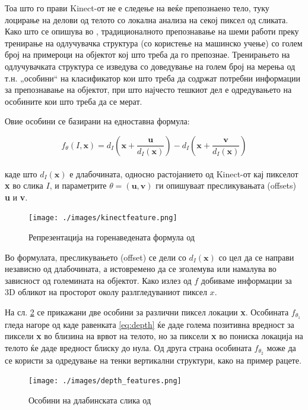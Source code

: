 \documentclass[11pt]{article}
\begin{document}
	Тоа што го прави Kinect-от не е следење на веќе препознаено тело, туку лоцирање на делови од телото со локална анализа на секој пиксел од сликата. Како што се опишува во \cite{machinelearning}, традиционалното препознавање на шеми работи преку тренирање на одлучувачка структура (со користење на машинско учење) со голем број на примероци на објектот кој што треба да го препознае. Тренирањето на одлучувачката структура се изведува со доведување на голем број на мерења од т.н. „особини“ на класификатор кои што треба да содржат потребни информации за препознавање на објектот, при што најчесто тешкиот дел е одредувањето на особините кои што треба да се мерат.\bigbreak

	Овие особини се базирани на едноставна формула:

  \begin{equation} \label{eq:depth}
	  f_\theta(I,\textbf{x}) = d_I(\textbf{x}+\frac{\textbf{u}}{d_I(\textbf{x})}) - d_I(\textbf{x}+\frac{\textbf{v}}{d_I(\textbf{x})})
    \end{equation}
  \\
  каде што $d_I(\textbf{x})$ е длабочината, односно растојанието од Kinect-от кај пикселот \textbf{x} во слика $I$, и параметрите $\theta = (\textbf{u},\textbf{v})$ ги опишуваат пресликувањата (offsets) \textbf{u} и \textbf{v}.

  \begin{figure}[H]
	  \texttt{[image: ./images/kinectfeature.png]}
		\centering
		\caption{Репрезентација на горенаведената формула од \cite{machinelearning}}
		\label{fig:kinectfeature.png}
	  \end{figure}

	Во формулата, пресликувањето (offset) се дели со $d_I(\textbf{x})$ со цел да се направи независно од длабочината, а истовремено да се зголемува или намалува во зависност од големината на објектот. Како излез од $f$ добиваме информации за 3D обликот на просторот околу разлгледуваниот пиксел $x$.\bigbreak

  На сл. \ref{fig:depth_features.png} се прикажани две особини за различни пиксел локации \textbf{x}. Особината $f_{\theta_1}$ гледа нагоре од каде равенката \ref{eq:depth} ќе даде голема позитивна вредност за пиксели \textbf{x} во близина на врвот на телото, но за пиксели \textbf{x} во пониска локација на телото ќе даде вредност блиску до нула. Од друга страна особината $f_{\theta_2}$ може да се користи за одредување на тенки вертикални структури, како на пример рацете.

  \begin{figure}[H]
    \texttt{[image: ./images/depth\_features.png]}
    \centering
    \caption{Особини на длабинската слика од \cite{machinelearning}}
    \label{fig:depth_features.png}
    \end{figure}
\end{document}
